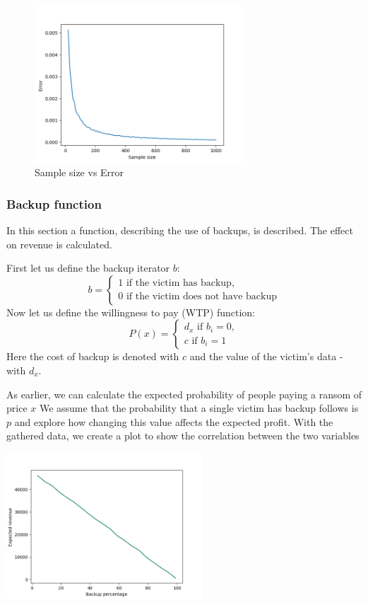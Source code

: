 \documentclass[11pt, a4paper]{article}
\theoremstyle{definition}
\begin{document}
			\begin{figure}[H]
			\begin{minipage}{1.0\textwidth}
				\centering
				\includegraphics[width=0.7\textwidth]{"Error vs sample size 4"}
				\caption{Sample size vs Error}\label{Fig:Data5}
			\end{minipage}
			\end{figure}
			\subsubsection{Backup function}
				In this section a function, describing the use of backups, is described. The effect on revenue is calculated.\par
				First let us define the backup iterator $b$: 
			$$
			b=
			\begin{cases}
				1 \text{ if the victim has backup},\\
				0 \text{ if the victim does not have backup}
			\end{cases}
			$$
			Now let us define the willingness to pay (WTP) function:
			$$
			P(x)=
			\begin{cases}
			d_{x} \text{ if } b_{i}=0,\\
			c \text{ if } b_{i}=1
			\end{cases}
			$$
				Here the cost of backup is denoted with $c$ and the value of the victim's data - with $d_{x}$.\par
				As earlier, we can calculate the expected probability of people paying a ransom of price $x$
				We assume that the probability that a single victim has backup follows is $p$ and explore how changing this value affects the expected profit. With the gathered data, we create a plot to show the correlation between the two variables
			\begin{center}
				\includegraphics[width=0.55\textwidth]{Revenue_vs_backup}
			\end{center}
\end{document}
